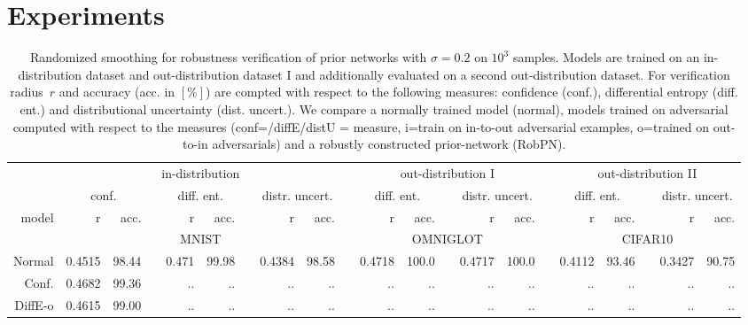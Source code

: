 
\section{Experiments}



\begin{table*}
	\centering
	\caption{Randomized smoothing for robustness verification of prior networks with $\sigma=0.2$ on $10^3$ samples. Models are trained on an in-distribution dataset and out-distribution dataset I and additionally evaluated on a second out-distribution dataset. For verification radius~$r$ and accuracy (acc. in $[\%]$) are compted with respect to the following measures: confidence (conf.), differential entropy (diff. ent.) and distributional uncertainty (dist. uncert.). We compare a normally trained model (normal), models trained on adversarial computed with respect to the measures (conf=/diffE/distU = measure, i=train on in-to-out adversarial examples, o=trained on out-to-in adversarials) and a robustly constructed prior-network (RobPN).}
	\begin{tiny}
		\begin{tabular}{@{}rrrcrrcrrcrrcrrcrrcrr@{}}
			\toprule
			& \multicolumn{8}{c}{in-distribution} &  & \multicolumn{5}{c}{out-distribution I} &   & \multicolumn{5}{c}{out-distribution II} \\
			\cmidrule{2-9} \cmidrule{11-15} \cmidrule{17-21}
			& \multicolumn{2}{c}{conf.} &   & \multicolumn{2}{c}{diff. ent.} &   & \multicolumn{2}{c}{distr. uncert.} &   
			& \multicolumn{2}{c}{diff. ent.} &   & \multicolumn{2}{c}{distr. uncert.} & 
			& \multicolumn{2}{c}{diff. ent.} &   & \multicolumn{2}{c}{distr. uncert.} \\
			\cmidrule{2-3}  \cmidrule{5-6} \cmidrule{8-9} \cmidrule{11-12}  \cmidrule{14-15} \cmidrule{17-18} \cmidrule{20-21}
			model & r & acc. & & r & acc. &  & r & acc. & & r & acc. & & r & acc. & & r & acc. & & r & acc. \\
			\midrule
			& \multicolumn{8}{c}{MNIST} & & \multicolumn{5}{c}{OMNIGLOT} & & \multicolumn{5}{c}{CIFAR10} \\
			Normal     & 0.4515 & 98.44 & & 0.471 & 99.98 & & 0.4384 & 98.58 & & 0.4718 & 100.0 & & 0.4717 & 100.0 & & 0.4112 & 93.46 & & 0.3427 & 90.75 \\
			Conf.      & 0.4682 & 99.36 & & .. & .. & & .. & .. & & .. & .. & & .. & .. & & .. & .. & & .. & .. \\
			DiffE-o    & 0.4615 & 99.00 & & .. & .. & & .. & .. & & .. & .. & & .. & .. & & .. & .. & & .. & .. \\

\end{tabular}
\end{tiny}
\end{table*}
